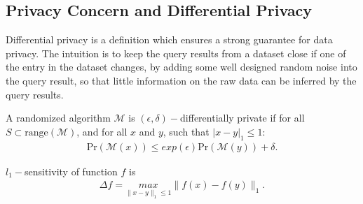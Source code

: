 \subsection{Privacy Concern and Differential Privacy}
\cite{dwork2014algorithmic, zhou2010security}Differential privacy is a definition which ensures a strong guarantee for data privacy. The intuition is to keep the query results from a dataset close if one of the entry in the dataset changes, by adding some well designed random noise into the query result, so that little information on the raw data can be inferred by the query results. 
\begin{defi}
A randomized algorithm $\mathcal{M}$ is $(\epsilon, \delta)-$differentially private if for all $S\subset\text{range}(\mathcal{M})$, and for all $x$ and $y$, such that $|x-y|_1\le 1$:
\begin{align}
\text{Pr}(\mathcal{M}(x))\le exp(\epsilon)\text{Pr}(\mathcal{M}(y))+\delta.
\end{align}
\end{defi}

\begin{defi}
$l_1-$sensitivity of function $f$ is 
\begin{align}
\Delta f = \underset{\|x-y\|_1\le1}{max}\|f(x)-f(y)\|_1.
\end{align}
\end{defi}


